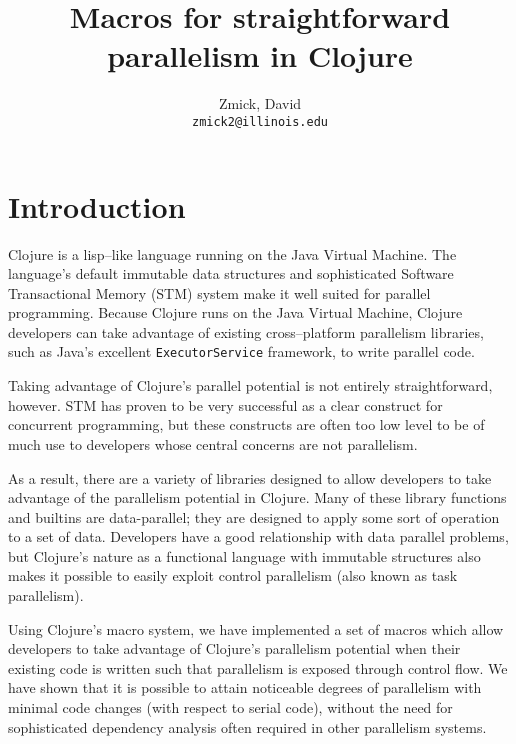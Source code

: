 \documentclass{sig-alternate}
\author{
    Zmick, David\\
    \texttt{zmick2@illinois.edu}
}
\title{Macros for straightforward parallelism in Clojure}
\def\code#1{\mbox{\texttt{#1}}}
\begin{document}
\maketitle

\section{Introduction}
Clojure is a lisp--like language running on the Java Virtual Machine.
The language's default immutable data structures and sophisticated Software Transactional Memory (STM) system make it well suited for parallel programming.
Because Clojure runs on the Java Virtual Machine, Clojure developers can take advantage of existing cross--platform parallelism libraries, such as Java's excellent \code{ExecutorService} framework, to write parallel code.

Taking advantage of Clojure's parallel potential is not entirely straightforward, however.
STM has proven to be very successful as a clear construct for concurrent programming\cite{Jones2007a}, but these constructs are often too low level to be of much use to developers whose central concerns are not parallelism\cite{Boehm2009}.

As a result, there are a variety of libraries designed to allow developers to take advantage of the parallelism potential in Clojure.\footnotemark{}\footnotemark{}\footnotemark{}\footnotemark{}\footnotemark{}
Many of these library functions and builtins are data-parallel; they are designed to apply some sort of operation to a set of data.
Developers have a good relationship with data parallel problems\cite{Okur2012a}, but Clojure's nature as a functional language with immutable structures also makes it possible to easily exploit control parallelism (also known as task parallelism\cite{Andradea, Rodr}).


Using Clojure's macro system, we have implemented a set of macros which allow developers to take advantage of Clojure's parallelism potential when their existing code is written such that parallelism is exposed through control flow.
We have shown that it is possible to attain noticeable degrees of parallelism with minimal code changes (with respect to serial code), without the need for sophisticated dependency analysis  often required in other parallelism systems.
\end{document}
